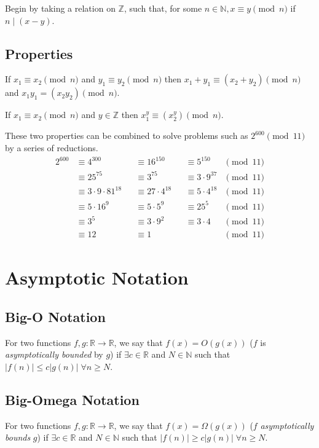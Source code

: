 \documentclass[10pt]{article}
\begin{document}
Begin by taking a relation on $\mathbb Z$, such that, for some $n\in\mathbb N, x\equiv y\pmod n$ if $n\mid(x-y)$.

\subsection{Properties}
If $x_1\equiv x_2\pmod n$ and $y_1\equiv y_2\pmod n$ then $x_1+y_1\equiv\left(x_2+y_2\right)\pmod n$ and $x_1y_1=\left(x_2y_2\right)\pmod n$.

If $x_1\equiv x_2\pmod n$ and $y\in\mathbb Z$ then $x_1^y\equiv\left(x_2^y\right)\pmod n$.

These two properties can be combined to solve problems such as $2^{600}\pmod{11}$ by a series of reductions.
\begin{align*}
2^{600}&\equiv 4^{300}             &&\equiv 16^{150}      &&\equiv 5^{150}      &\pmod{11}\\
       &\equiv 25^{75}             &&\equiv 3^{75}        &&\equiv 3\cdot9^{37} &\pmod{11}\\
       &\equiv 3\cdot9\cdot81^{18} &&\equiv 27\cdot4^{18} &&\equiv 5\cdot4^{18} &\pmod{11}\\
       &\equiv 5\cdot 16^9         &&\equiv 5\cdot 5^9    &&\equiv 25^5         &\pmod{11}\\
       &\equiv 3^5                 &&\equiv 3\cdot 9^2    &&\equiv 3\cdot4      &\pmod{11}\\
       &\equiv 12                  &&\equiv 1             &&                    &\pmod{11}
\end{align*}

\section{Asymptotic Notation}
\subsection{Big-O Notation}
For two functions $f,g:\mathbb R\to\mathbb R$, we say that $f(x)=O(g(x))$ ($f$ is \emph{asymptotically bounded} by $g$) if $\exists c\in\mathbb R$ and $N\in\mathbb N$ such that $\left|f(n)\right|\le c\left|g(n)\right|\;\forall n\ge N$.
\subsection{Big-Omega Notation}
For two functions $f,g:\mathbb R\to\mathbb R$, we say that $f(x)=\Omega(g(x))$ ($f$ \emph{asymptotically bounds} $g$) if $\exists c\in\mathbb R$ and $N\in\mathbb N$ such that $\left|f(n)\right|\ge c\left|g(n)\right|\;\forall n\ge N$.
\end{document}
